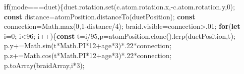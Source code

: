 \documentclass[
  canadien,
  11pt,
  letterpaper,
]{article}
\newenvironment{Shaded}{}{}
\newcommand{\AttributeTok}[1]{\textcolor[rgb]{0.49,0.56,0.16}{#1}}
\newcommand{\BaseNTok}[1]{\textcolor[rgb]{0.25,0.63,0.44}{#1}}
\newcommand{\BuiltInTok}[1]{\textcolor[rgb]{0.00,0.50,0.00}{#1}}
\newcommand{\ConstantTok}[1]{\textcolor[rgb]{0.53,0.00,0.00}{#1}}
\newcommand{\ControlFlowTok}[1]{\textcolor[rgb]{0.00,0.44,0.13}{\textbf{#1}}}
\newcommand{\DecValTok}[1]{\textcolor[rgb]{0.25,0.63,0.44}{#1}}
\newcommand{\FunctionTok}[1]{\textcolor[rgb]{0.02,0.16,0.49}{#1}}
\newcommand{\KeywordTok}[1]{\textcolor[rgb]{0.00,0.44,0.13}{\textbf{#1}}}
\newcommand{\NormalTok}[1]{#1}
\newcommand{\OperatorTok}[1]{\textcolor[rgb]{0.40,0.40,0.40}{#1}}
\newcommand{\StringTok}[1]{\textcolor[rgb]{0.25,0.44,0.63}{#1}}
\begin{document}
\begin{Shaded}
\begin{Highlighting}[]
\ControlFlowTok{if}\NormalTok{(mode}\OperatorTok{===}\StringTok{\textquotesingle{}duet\textquotesingle{}}\NormalTok{)\{duet}\OperatorTok{.}\AttributeTok{rotation}\OperatorTok{.}\FunctionTok{set}\NormalTok{(c}\OperatorTok{.}\AttributeTok{atom}\OperatorTok{.}\AttributeTok{rotation}\OperatorTok{.}\AttributeTok{x}\OperatorTok{,{-}}\NormalTok{c}\OperatorTok{.}\AttributeTok{atom}\OperatorTok{.}\AttributeTok{rotation}\OperatorTok{.}\AttributeTok{y}\OperatorTok{,}\DecValTok{0}\NormalTok{)}\OperatorTok{;}
\KeywordTok{const}\NormalTok{ distance}\OperatorTok{=}\NormalTok{atomPosition}\OperatorTok{.}\FunctionTok{distanceTo}\NormalTok{(duetPosition)}\OperatorTok{;}
\KeywordTok{const}\NormalTok{ connection}\OperatorTok{=}\BuiltInTok{Math}\OperatorTok{.}\FunctionTok{max}\NormalTok{(}\DecValTok{0}\OperatorTok{,}\DecValTok{1}\OperatorTok{{-}}\NormalTok{distance}\OperatorTok{/}\DecValTok{4}\NormalTok{)}\OperatorTok{;}
\NormalTok{braid}\OperatorTok{.}\AttributeTok{visible}\OperatorTok{=}\NormalTok{connection}\OperatorTok{\textgreater{}.}\BaseNTok{01}\OperatorTok{;}
\ControlFlowTok{for}\NormalTok{(}\KeywordTok{let}\NormalTok{ i}\OperatorTok{=}\DecValTok{0}\OperatorTok{;}
\NormalTok{i}\OperatorTok{\textless{}}\DecValTok{96}\OperatorTok{;}
\NormalTok{i}\OperatorTok{++}\NormalTok{)\{}\KeywordTok{const}\NormalTok{ t}\OperatorTok{=}\NormalTok{i}\OperatorTok{/}\DecValTok{95}\OperatorTok{,}\NormalTok{p}\OperatorTok{=}\NormalTok{atomPosition}\OperatorTok{.}\FunctionTok{clone}\NormalTok{()}\OperatorTok{.}\FunctionTok{lerp}\NormalTok{(duetPosition}\OperatorTok{,}\NormalTok{t)}\OperatorTok{;}
\NormalTok{p}\OperatorTok{.}\AttributeTok{y}\OperatorTok{+=}\BuiltInTok{Math}\OperatorTok{.}\FunctionTok{sin}\NormalTok{(t}\OperatorTok{*}\BuiltInTok{Math}\OperatorTok{.}\ConstantTok{PI}\OperatorTok{*}\DecValTok{12}\OperatorTok{+}\NormalTok{age}\OperatorTok{*}\DecValTok{3}\NormalTok{)}\OperatorTok{*.}\DecValTok{22}\OperatorTok{*}\NormalTok{connection}\OperatorTok{;}
\NormalTok{p}\OperatorTok{.}\AttributeTok{z}\OperatorTok{+=}\BuiltInTok{Math}\OperatorTok{.}\FunctionTok{cos}\NormalTok{(t}\OperatorTok{*}\BuiltInTok{Math}\OperatorTok{.}\ConstantTok{PI}\OperatorTok{*}\DecValTok{12}\OperatorTok{+}\NormalTok{age}\OperatorTok{*}\DecValTok{3}\NormalTok{)}\OperatorTok{*.}\DecValTok{22}\OperatorTok{*}\NormalTok{connection}\OperatorTok{;}
\NormalTok{p}\OperatorTok{.}\FunctionTok{toArray}\NormalTok{(braidArray}\OperatorTok{,}\NormalTok{i}\OperatorTok{*}\DecValTok{3}\NormalTok{)}\OperatorTok{;}

\end{Highlighting}
\end{Shaded}
\end{document}
